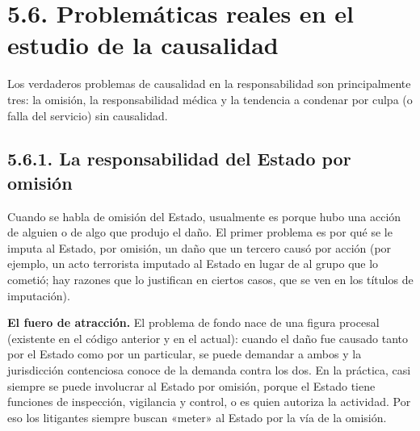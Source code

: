 \section{5.6. Problemáticas reales en el estudio de la causalidad}
Los verdaderos problemas de causalidad en la responsabilidad son principalmente tres: la omisión, la responsabilidad médica y la tendencia a condenar por culpa (o falla del servicio) sin causalidad.

\subsection{5.6.1. La responsabilidad del Estado por omisión}
Cuando se habla de omisión del Estado, usualmente es porque hubo una acción de alguien o de algo que produjo el daño. El primer problema es por qué se le imputa al Estado, por omisión, un daño que un tercero causó por acción (por ejemplo, un acto terrorista imputado al Estado en lugar de al grupo que lo cometió; hay razones que lo justifican en ciertos casos, que se ven en los títulos de imputación).

\textbf{El fuero de atracción.} El problema de fondo nace de una figura procesal (existente en el código anterior y en el actual): cuando el daño fue causado tanto por el Estado como por un particular, se puede demandar a ambos y la jurisdicción contenciosa conoce de la demanda contra los dos. En la práctica, casi siempre se puede involucrar al Estado por omisión, porque el Estado tiene funciones de inspección, vigilancia y control, o es quien autoriza la actividad. Por eso los litigantes siempre buscan «meter» al Estado por la vía de la omisión.

